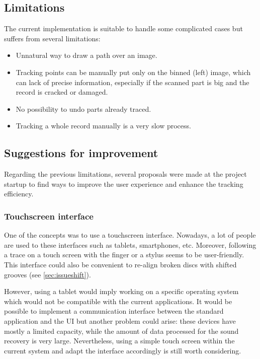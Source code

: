 \subsection{Limitations}

The current implementation is suitable to handle some complicated cases but suffers from several limitations:

\begin{itemize}
\item Unnatural way to draw a path over an image.
\item Tracking points can be manually put only on the binned (left) image, which can lack of precise information, especially if the scanned part is big and the record is cracked or damaged.
\item No possibility to undo parts already traced.
\item Tracking a whole record manually is a very slow process.
\end{itemize}

\subsection{Suggestions for improvement}

Regarding the previous limitations, several proposals were made at the project startup to find ways to improve the user experience and enhance the tracking efficiency.

\subsubsection{Touchscreen interface}

One of the concepts was to use a touchscreen interface. Nowadays, a lot of people are used to these interfaces such as tablets, smartphones, etc. Moreover, following a trace on a touch screen with the finger or a stylus seems to be user-friendly. This interface could also be convenient to re-align broken discs with shifted grooves (see \autoref{sec:issueshift}).

However, using a tablet would imply working on a specific operating system which would not be compatible with the current applications. It would be possible to implement a communication interface between the standard application and the UI but another problem could arise: these devices have mostly a limited capacity, while the amount of data processed for the sound recovery is very large. Nevertheless, using a simple touch screen within the current system and adapt the interface accordingly is still worth considering.

